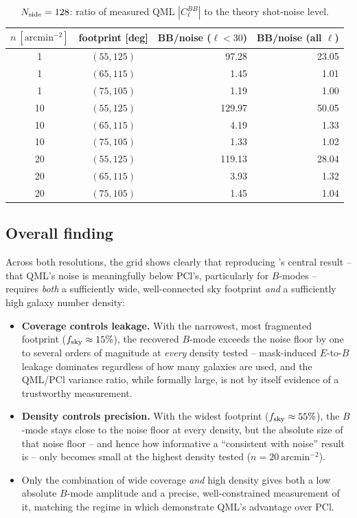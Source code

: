 \documentclass[11pt]{article}
\begin{document}
\begin{table}[H]
\centering
\begin{tabular}{ccrr}
\toprule
$n\ [\mathrm{arcmin}^{-2}]$ & footprint [deg] & BB/noise ($\ell<30$) & BB/noise (all $\ell$) \\
\midrule
1  & $(55,125)$ & 97.28  & 23.05 \\
1  & $(65,115)$ &  1.45  &  1.01 \\
1  & $(75,105)$ &  1.19  &  1.00 \\
10 & $(55,125)$ & 129.97 & 50.05 \\
10 & $(65,115)$ &  4.19  &  1.33 \\
10 & $(75,105)$ &  1.33  &  1.02 \\
20 & $(55,125)$ & 119.13 & 28.04 \\
20 & $(65,115)$ &  3.93  &  1.32 \\
20 & $(75,105)$ &  1.45  &  1.04 \\
\bottomrule
\end{tabular}
\caption{$N_{\rm side}=128$: ratio of measured QML $|C_\ell^{BB}|$ to the theory
shot-noise level.}
\label{tab:bbnoise128}
\end{table}

\subsection{Overall finding}

Across both resolutions, the grid shows clearly that reproducing \citet{Maraio2022}'s
central result -- that QML's noise is meaningfully below PCl's, particularly for
$B$-modes -- requires \emph{both} a sufficiently wide, well-connected sky footprint
\emph{and} a sufficiently high galaxy number density:
\begin{itemize}
\item \textbf{Coverage controls leakage.} With the narrowest, most fragmented footprint
($f_{\rm sky}\approx15\%$), the recovered $B$-mode exceeds the noise floor by one to
several orders of magnitude at \emph{every} density tested -- mask-induced $E$-to-$B$
leakage dominates regardless of how many galaxies are used, and the QML/PCl variance
ratio, while formally large, is not by itself evidence of a trustworthy measurement.
\item \textbf{Density controls precision.} With the widest footprint
($f_{\rm sky}\approx55\%$), the $B$-mode stays close to the noise floor at every
density, but the absolute size of that noise floor -- and hence how informative a
``consistent with noise'' result is -- only becomes small at the highest density tested
($n=20\ \mathrm{arcmin}^{-2}$).
\item Only the combination of wide coverage \emph{and} high density gives both a low
absolute $B$-mode amplitude and a precise, well-constrained measurement of it, matching
the regime in which \citet{Maraio2022} demonstrate QML's advantage over PCl.
\end{itemize}
\end{document}
